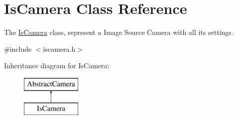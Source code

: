 \hypertarget{class_is_camera}{\section{Is\-Camera Class Reference}
\label{class_is_camera}
}


The \hyperlink{class_is_camera}{Is\-Camera} class, represent a Image Source Camera with all its settings.  




{\ttfamily \#include $<$iscamera.\-h$>$}

Inheritance diagram for Is\-Camera\-:\begin{figure}[H]
\begin{center}
\leavevmode
\includegraphics[height=2.000000cm]{class_is_camera}
\end{center}
\end{figure}
